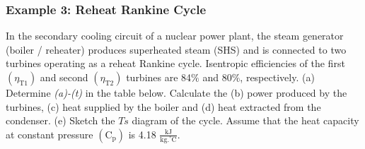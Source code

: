 \documentclass[10pt,compress]{beamer}
\begin{document}
\begin{frame}
 \frametitle{Example 3: Reheat Rankine Cycle}
    \scriptsize In the secondary cooling circuit of a nuclear power plant, the steam generator (boiler / reheater) produces superheated steam (SHS) and is connected to two turbines operating as a reheat Rankine cycle. Isentropic efficiencies of the first $\left(\eta_{\text{T1}}\right)$ and second $\left(\eta_{\text{T2}}\right)$ turbines are 84$\%$ and 80$\%$, respectively. (a) Determine {\it (a)-(t)} in the table below. Calculate the (b) power produced by the turbines, (c) heat supplied by the boiler and (d) heat extracted from the condenser. (e) Sketch the $Ts$ diagram of the cycle. Assume that the heat capacity at constant pressure $\left(\text{C}_{\text{p}}\right)$ is 4.18 $\frac{\text{kJ}}{\text{kg.}^{\circ}\text{C}}$.


\end{frame}
\end{document}
